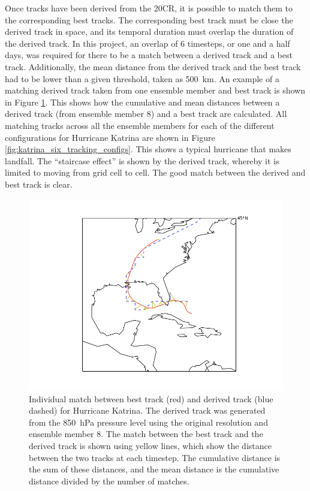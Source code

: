 \documentclass[pdftex,12pt,a4paper]{report}
\begin{document}
Once tracks have been derived from the 20CR, it is possible to match them to the corresponding best
tracks. The corresponding best track must be close the derived track in space, and its temporal
duration must overlap the duration of the derived track. In this project, an overlap of 6 timesteps,
or one and a half days, was required for there to be a match between a derived track and a best
track. Additionally, the mean distance from the derived track and the best track had to be lower
than a given threshold, taken as \SI{500}{km}. An example of a matching derived track taken from
one ensemble member and best track is shown in Figure \ref{fig:katrina_individual_match_em7}.
This shows how the cumulative and mean distances between a derived track (from ensemble member 8)
and a best track are calculated. All matching tracks across all the ensemble members for each of the
different configurations for Hurricane Katrina are shown in Figure
\ref{fig:katrina_six_tracking_configs}. This shows a typical hurricane that makes landfall. The
``staircase effect'' is shown by the derived track, whereby it is limited to moving from grid cell
to cell. The good match between the derived and best track is clear.

\begin{figure}[hb!]
    \centering
    \includegraphics[width=\linewidth]{figures/katrina_individual_match_em7}
    \caption{Individual match between best track (red) and derived track (blue dashed) for Hurricane
        Katrina. The derived track was generated from the \SI{850}{hPa} pressure level using the
        original resolution and ensemble member 8. The match between the best track and the derived
        track is shown using yellow lines, which show the distance between the two tracks at each
        timestep. The cumulative distance is the sum of these distances, and the mean distance is
        the cumulative distance divided by the number of matches.
    }
    \label{fig:katrina_individual_match_em7}
\end{figure}
\end{document}
